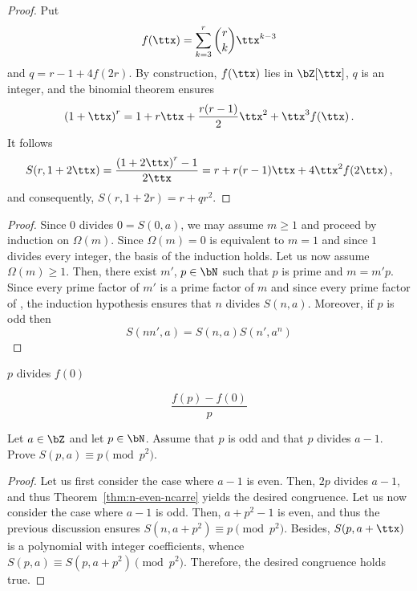 



 \begin{proof}
   Put
   $$
   f(\ttx) = \sum_{k = 3}^r \binom{r}{k} \ttx^{k - 3}
   $$
   and $q =  r - 1  +  4 f(2r)$.
   By construction, $f(\ttx)$ lies in $\bZ[\ttx]$, $q$ is an integer, and the binomial theorem ensures 
   $$
   {(1 + \ttx)}^r = 1 + r \ttx + \frac{r(r - 1)}{2} \ttx^2 + \ttx^3 f(\ttx)  \, .
   $$
   It follows
   $$
   S(r, 1 + 2 \ttx) = \frac{{(1 + 2 \ttx)}^r - 1}{2 \ttx} = r + r(r - 1) \ttx + 4 \ttx^2 f(2 \ttx) \,,
   $$
   and consequently, $S(r, 1 + 2r) = r + q r^2$.
 \end{proof}

\begin{proof}
  Since $0$ divides $0 = S(0, a)$,  we may assume $m \ge 1$ and proceed by induction on $\Omega(m)$.
  Since  $\Omega(m) = 0$ is equivalent to $m = 1$ and since $1$ divides every integer,
  the basis of the induction holds.
  Let us now assume  $\Omega(m) \ge 1$.
  Then, there exist $m'$, $p \in \bN$  such that  $p$ is prime and $m = m' p$.
  Since every prime factor of $m'$ is a prime factor of $m$ and since every prime factor of , the induction hypothesis ensures that $n$ divides $S(n, a)$.
  Moreover, if $p$ is odd then 
  $$
  S(n n', a) = S(n, a) S(n', a^n)
  $$
\end{proof}


$p$ divides $f(0)$

$$
\frac{f(p) - f(0)}{p}
$$


 \begin{exercise}  \label{exo:n-odd-carre}
   Let $a \in \bZ$ and let $p \in \bN$.
   Assume that $p$ is odd and that $p$ divides $a  - 1$.
   Prove $S(p, a) \equiv p \pmod {p^2}$.
 \end{exercise}
 
 \begin{proof}
   Let us first consider the case where $a - 1$ is even.
   Then, $2p$ divides $a - 1$, and thus Theorem~\ref{thm:n-even-ncarre} yields the desired congruence.
   Let us now consider the case where $a - 1$ is odd.
   Then, $a + p^2 - 1$ is even, and thus the previous discussion ensures $S(n, a + p^2) \equiv p \pmod {p^2}$.
   Besides, $S(p, a + \ttx)$ is a polynomial with integer coefficients,
   whence $S(p, a) \equiv S(p, a + p^2) \pmod{p^2}$.
   Therefore, the desired congruence  holds true.
 \end{proof}
 

